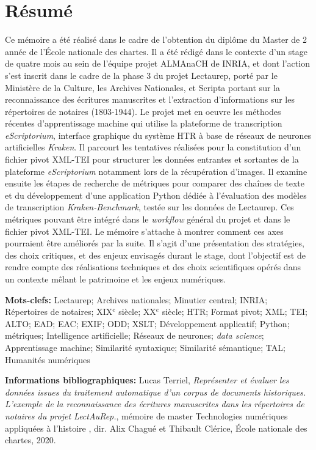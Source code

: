\chapter*{Résumé}
Ce mémoire a été réalisé dans le cadre de l'obtention du diplôme du Master de 2 année  de l'École nationale des chartes. 
Il a été rédigé dans le contexte d'un stage de quatre mois au sein de l'équipe projet ALMAnaCH de INRIA, et dont l'action  s'est inscrit dans le cadre de la phase 3 du projet Lectaurep, porté par le Ministère de la Culture, les Archives Nationales, et Scripta portant sur la reconnaissance des écritures manuscrites et l'extraction d'informations sur les répertoires de notaires (1803-1944). Le projet met en oeuvre les méthodes récentes d'apprentissage machine qui utilise la plateforme de transcription \textit{eScriptorium}, interface graphique du système HTR à base de réseaux de neurones artificielles \textit{Kraken}. Il parcourt les tentatives réalisées pour la constitution d'un fichier pivot XML-TEI pour structurer les données entrantes et sortantes de la plateforme \textit{eScriptorium} notamment lors de la récupération d'images. Il examine ensuite les étapes de recherche de métriques pour comparer des chaînes de texte et du développement d'une application Python dédiée à l'évaluation des modèles de transcription \textit{Kraken-Benchmark}, testée sur les données de Lectaurep. Ces métriques pouvant être intégré dans le \textit{workflow} général du projet et dans le fichier pivot XML-TEI. Le mémoire s'attache à montrer comment ces axes pourraient être améliorés par la suite. Il s'agit d'une présentation des stratégies, des choix critiques, et des enjeux envisagés durant le stage, dont l'objectif est de rendre compte des réalisations techniques et des choix scientifiques opérés dans un contexte mêlant le patrimoine et les enjeux numériques. 

\bigskip
\textbf{Mots-clefs:} Lectaurep; Archives nationales; Minutier central; INRIA; Répertoires de notaires; XIX$^{e}$ siècle; XX$^{e}$ siècle; HTR; Format pivot; XML; TEI; ALTO; EAD; EAC; EXIF; ODD; XSLT; Développement applicatif; Python; métriques; Intelligence artificielle; Réseaux de neurones; \textit{data science}; Apprentissage machine; Similarité syntaxique; Similarité sémantique; TAL; Humanités numériques

\bigskip
\textbf{Informations bibliographiques:} Lucas Terriel, \textit{Représenter et évaluer les données issues du traitement automatique d'un corpus de documents historiques. L'exemple de la reconnaissance des écritures manuscrites dans les répertoires de notaires du projet LectAuRep.}, mémoire de master \og Technologies numériques appliquées à l'histoire \fg{}, dir. Alix Chagué et Thibault Clérice, École nationale des chartes, 2020.

\clearpage
\thispagestyle{empty}
\cleardoublepage